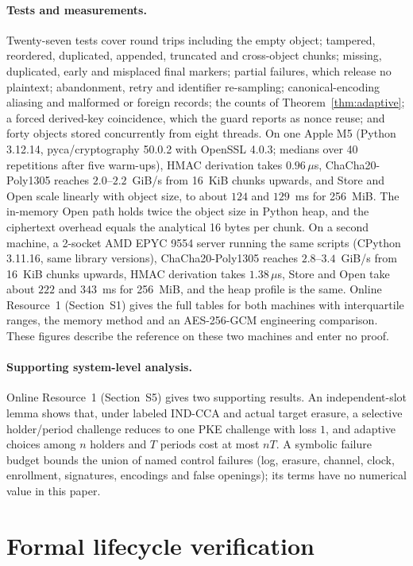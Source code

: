 \documentclass[pdflatex,sn-mathphys-num]{sn-jnl}%
\theoremstyle{plain}
\theoremstyle{definition}
\begin{document}
\paragraph{Tests and measurements.}
Twenty-seven tests cover round trips including the empty object; tampered, reordered, duplicated, appended, truncated and cross-object chunks; missing, duplicated, early and misplaced final markers; partial failures, which release no plaintext; abandonment, retry and identifier re-sampling; canonical-encoding aliasing and malformed or foreign records; the counts of Theorem~\ref{thm:adaptive}; a forced derived-key coincidence, which the guard reports as nonce reuse; and forty objects stored concurrently from eight threads. On one Apple M5 (Python 3.12.14, pyca/cryptography 50.0.2 with OpenSSL 4.0.3; medians over 40 repetitions after five warm-ups), HMAC derivation takes $0.96\,\mu$s, ChaCha20-Poly1305 reaches $2.0$--$2.2$~GiB/s from 16~KiB chunks upwards, and Store and Open scale linearly with object size, to about $124$ and $129$~ms for 256~MiB. The in-memory Open path holds twice the object size in Python heap, and the ciphertext overhead equals the analytical 16 bytes per chunk. On a second machine, a 2-socket AMD EPYC 9554 server running the same scripts (CPython 3.11.16, same library versions), ChaCha20-Poly1305 reaches $2.8$--$3.4$~GiB/s from 16~KiB chunks upwards, HMAC derivation takes $1.38\,\mu$s, Store and Open take about $222$ and $343$~ms for 256~MiB, and the heap profile is the same. Online Resource~1 (Section~S1) gives the full tables for both machines with interquartile ranges, the memory method and an AES-256-GCM engineering comparison. These figures describe the reference on these two machines and enter no proof.

\paragraph{Supporting system-level analysis.}
Online Resource~1 (Section~S5) gives two supporting results. An independent-slot lemma shows that, under labeled IND-CCA and actual target erasure, a selective holder/period challenge reduces to one PKE challenge with loss $1$, and adaptive choices among $n$ holders and $T$ periods cost at most $nT$. A symbolic failure budget bounds the union of named control failures (log, erasure, channel, clock, enrollment, signatures, encodings and false openings); its terms have no numerical value in this paper.



\section{Formal lifecycle verification}\label{sec:formal}
\end{document}
